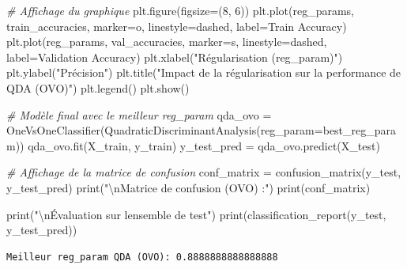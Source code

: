 \documentclass[
  letterpaper,
  DIV=11,
  numbers=noendperiod]{scrartcl}
\newenvironment{Shaded}{}{}
\newcommand{\BuiltInTok}[1]{\textcolor[rgb]{0.00,0.50,0.00}{#1}}
\newcommand{\CharTok}[1]{\textcolor[rgb]{0.25,0.44,0.63}{#1}}
\newcommand{\CommentTok}[1]{\textcolor[rgb]{0.38,0.63,0.69}{\textit{#1}}}
\newcommand{\DecValTok}[1]{\textcolor[rgb]{0.25,0.63,0.44}{#1}}
\newcommand{\NormalTok}[1]{#1}
\newcommand{\OperatorTok}[1]{\textcolor[rgb]{0.40,0.40,0.40}{#1}}
\newcommand{\StringTok}[1]{\textcolor[rgb]{0.25,0.44,0.63}{#1}}
\begin{document}
\begin{Shaded}
\begin{Highlighting}[]
\CommentTok{\# Affichage du graphique}
\NormalTok{plt.figure(figsize}\OperatorTok{=}\NormalTok{(}\DecValTok{8}\NormalTok{, }\DecValTok{6}\NormalTok{))}
\NormalTok{plt.plot(reg\_params, train\_accuracies, marker}\OperatorTok{=}\StringTok{\textquotesingle{}o\textquotesingle{}}\NormalTok{, linestyle}\OperatorTok{=}\StringTok{\textquotesingle{}dashed\textquotesingle{}}\NormalTok{, label}\OperatorTok{=}\StringTok{\textquotesingle{}Train Accuracy\textquotesingle{}}\NormalTok{)}
\NormalTok{plt.plot(reg\_params, val\_accuracies, marker}\OperatorTok{=}\StringTok{\textquotesingle{}s\textquotesingle{}}\NormalTok{, linestyle}\OperatorTok{=}\StringTok{\textquotesingle{}dashed\textquotesingle{}}\NormalTok{, label}\OperatorTok{=}\StringTok{\textquotesingle{}Validation Accuracy\textquotesingle{}}\NormalTok{)}
\NormalTok{plt.xlabel(}\StringTok{"Régularisation (reg\_param)"}\NormalTok{)}
\NormalTok{plt.ylabel(}\StringTok{"Précision"}\NormalTok{)}
\NormalTok{plt.title(}\StringTok{"Impact de la régularisation sur la performance de QDA (OVO)"}\NormalTok{)}
\NormalTok{plt.legend()}
\NormalTok{plt.show()}

\CommentTok{\# Modèle final avec le meilleur reg\_param}
\NormalTok{qda\_ovo }\OperatorTok{=}\NormalTok{ OneVsOneClassifier(QuadraticDiscriminantAnalysis(reg\_param}\OperatorTok{=}\NormalTok{best\_reg\_param))}
\NormalTok{qda\_ovo.fit(X\_train, y\_train)}
\NormalTok{y\_test\_pred }\OperatorTok{=}\NormalTok{ qda\_ovo.predict(X\_test)}

\CommentTok{\# Affichage de la matrice de confusion}
\NormalTok{conf\_matrix }\OperatorTok{=}\NormalTok{ confusion\_matrix(y\_test, y\_test\_pred)}
\BuiltInTok{print}\NormalTok{(}\StringTok{"}\CharTok{\textbackslash{}n}\StringTok{Matrice de confusion (OVO) :"}\NormalTok{)}
\BuiltInTok{print}\NormalTok{(conf\_matrix)}

\BuiltInTok{print}\NormalTok{(}\StringTok{"}\CharTok{\textbackslash{}n}\StringTok{Évaluation sur l\textquotesingle{}ensemble de test"}\NormalTok{)}
\BuiltInTok{print}\NormalTok{(classification\_report(y\_test, y\_test\_pred))}
\end{Highlighting}
\end{Shaded}

\begin{verbatim}
Meilleur reg_param QDA (OVO): 0.8888888888888888
\end{verbatim}
\end{document}
